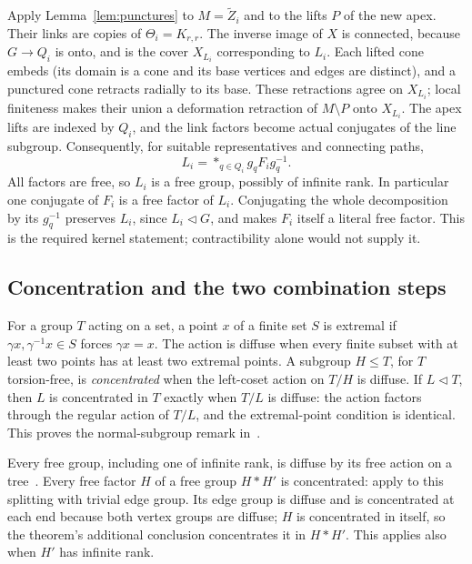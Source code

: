 Apply Lemma~\ref{lem:punctures} to \(M=\widetilde Z_i\) and to the
lifts \(P\) of the new apex. Their links are copies of
\(\Theta_i=K_{r,r}\). The inverse image of \(X\) is connected,
because \(G\to Q_i\) is onto, and is the cover \(X_{L_i}\)
corresponding to \(L_i\). Each lifted cone embeds (its domain is a
cone and its base vertices and edges are distinct), and a punctured
cone retracts radially to its base. These retractions agree on
\(X_{L_i}\); local finiteness makes their union a deformation
retraction of \(M\setminus P\) onto \(X_{L_i}\).
The apex lifts are indexed by \(Q_i\), and the link factors become
actual conjugates of the line subgroup. Consequently, for suitable
representatives and connecting paths,
\begin{equation}\label{eq:line-kernel-product}
 L_i=\mathop{*}_{q\in Q_i}g_qF_i g_q^{-1}.
\end{equation}
All factors are free, so \(L_i\) is a free group, possibly of infinite
rank. In particular one conjugate of \(F_i\) is a free factor of \(L_i\).
Conjugating the whole decomposition by its \(g_q^{-1}\) preserves
\(L_i\), since \(L_i\lhd G\), and makes \(F_i\) itself a literal
free factor. This is the required kernel statement; contractibility
alone would not supply it.

\subsection{Concentration and the two combination steps}

For a group \(T\) acting on a set, a point \(x\) of a finite set
\(S\) is extremal if \(\gamma x,\gamma^{-1}x\in S\) forces
\(\gamma x=x\). The action is diffuse when every finite subset
with at least two points has at least two extremal points.
A subgroup \(H\le T\), for \(T\) torsion-free, is
\emph{concentrated} when the left-coset action on \(T/H\) is diffuse.
If \(L\lhd T\), then \(L\) is concentrated in \(T\) exactly when
\(T/L\) is diffuse: the action factors through the regular action of
\(T/L\), and the extremal-point condition is identical. This proves
the normal-subgroup remark in~\cite[p.~4 of the author version]{Bowditch}.

Every free group, including one of infinite rank, is diffuse by its
free action on a tree~\cite[Theorem~1.2(3)]{Bowditch}. Every free factor
\(H\) of a free group \(H*H'\) is concentrated: apply
\cite[Theorem~1.3(2)]{Bowditch} to this splitting with trivial edge
group. Its edge group is diffuse and is concentrated at each end
because both vertex groups are diffuse; \(H\) is concentrated in
itself, so the theorem's additional conclusion concentrates it in
\(H*H'\). This applies also when \(H'\) has infinite rank.

